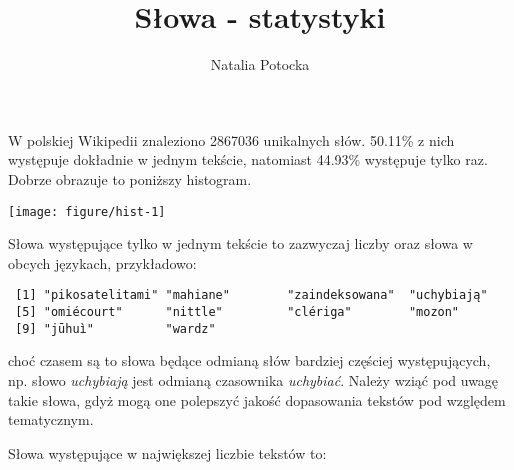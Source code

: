 \documentclass[12pt, twoside, openany]{report}
\author{Natalia Potocka}
\title{Słowa - statystyki}
\theoremstyle{plain}
\begin{document}
\maketitle
{}
\newpage






W polskiej Wikipedii znaleziono 2867036 unikalnych słów. 50.11\% z nich występuje dokładnie w jednym tekście, natomiast 44.93\% występuje tylko raz. Dobrze obrazuje to poniższy histogram.

\begin{knitrout}
\color{fgcolor}
\texttt{[image: figure/hist-1]} 

\end{knitrout}

Słowa występujące tylko w jednym tekście to zazwyczaj liczby oraz słowa w obcych językach, przykładowo:

\begin{knitrout}
\color{fgcolor}\begin{kframe}
\begin{verbatim}
 [1] "pikosatelitami" "mahiane"        "zaindeksowana"  "uchybiają"     
 [5] "omiécourt"      "nittle"         "clériga"        "mozon"         
 [9] "jūhuì"          "wardz"         
\end{verbatim}
\end{kframe}
\end{knitrout}

choć czasem są to słowa będące odmianą słów bardziej częściej występujących, np. słowo \emph{uchybiają} jest odmianą czasownika \emph{uchybiać}. Należy wziąć pod uwagę takie słowa, gdyż mogą one polepszyć jakość dopasowania tekstów pod względem tematycznym.

%
%
%

Słowa występujące w największej liczbie tekstów to:\\
\end{document}
